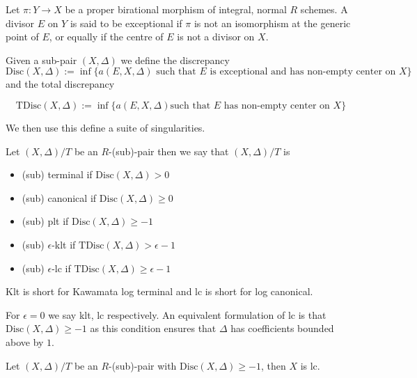 \documentclass[a4paper,12pt]{book}
\begin{document}
\begin{definition}
	
	Let $\pi:Y \to X$ be a proper birational morphism of integral, normal $R$ schemes. A divisor $E$ on $Y$ is said to be exceptional if $\pi$ is not an isomorphism at the generic point of $E$, or equally if the centre of $E$ is not a divisor on $X$.
	
	Given a sub-pair $(X,\Delta)$ we define the discrepancy $$\text{Disc}(X,\Delta):=\inf \{a(E,X,\Delta) \text{ such that } E \text{ is exceptional and has non-empty center on } X\}$$
	and the total discrepancy 
	
	$$\text{TDisc}(X,\Delta):=\inf \{a(E,X,\Delta) \text {such that } E \text{ has non-empty center on } X\}$$
\end{definition}

We then use this define a suite of singularities.

\begin{definition}
	Let $(X,\Delta)/T$ be an $R$-(sub)-pair then we say that $(X,\Delta)/T$ is
	\begin{itemize}
	\item 	(sub) terminal if $\text{Disc}(X,\Delta) > 0$
	\item	(sub) canonical if $\text{Disc}(X,\Delta)\geq 0$
	\item 	(sub) plt if $\text{Disc}(X,\Delta)\geq -1$
	\item	(sub) $\epsilon$-klt if $\text{TDisc}(X,\Delta) > \epsilon-1$
	\item	(sub) $\epsilon$-lc if $\text{TDisc}(X,\Delta) \geq \epsilon -1$
	\end{itemize}
\end{definition}

\begin{remark}
	
	Klt is short for Kawamata log terminal and lc is short for log canonical.
	\end{remark}

For $\epsilon=0$ we say klt, lc respectively. An equivalent formulation of lc is that $\text{Disc}(X,\Delta) \geq -1$ as this condition ensures that $\Delta$ has coefficients bounded above by $1$.

\begin{lemma}
	
	Let $(X,\Delta)/T$ be an $R$-(sub)-pair with $\text{Disc}(X,\Delta) \geq -1$, then $X$ is lc.
	
	\end{lemma}
\end{document}
